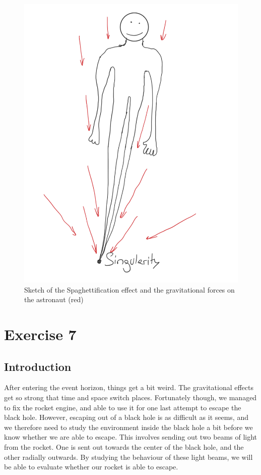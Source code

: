 \documentclass[reprint,english,notitlepage]{revtex4-2}
\begin{document}
        \begin{figure}[h]
            \centering
            \includegraphics[scale=0.15]{spaghettification}
            \caption{Sketch of the Spaghettification effect and the gravitational forces on the astronaut (red)}\label{fig:spaghettification}
        \end{figure}


\newpage
\section{Exercise 7}\label{sec:exercise-7}
    \subsection{Introduction}\label{subsec:introduction7}
        After entering the event horizon, things get a bit weird.
        The gravitational effects get so strong that time and space switch places.
        Fortunately though, we managed to fix the rocket engine, and able to use it for one last attempt to escape the black hole.
        However, escaping out of a black hole is as difficult as it seems, and we therefore need to study the environment inside the black hole a bit before we know whether we are able to escape.
        This involves sending out two beams of light from the rocket.
        One is sent out towards the center of the black hole, and the other radially outwards.
        By studying the behaviour of these light beams, we will be able to evaluate whether our rocket is able to escape.
\end{document}
